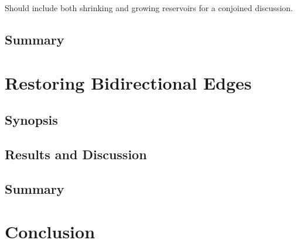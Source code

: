 Should include both shrinking and growing reservoirs for a conjoined discussion.

\subsection{Summary}

\section{Restoring Bidirectional Edges}

\subsection{Synopsis}

\subsection{Results and Discussion}

\subsection{Summary}

\section{Conclusion}


